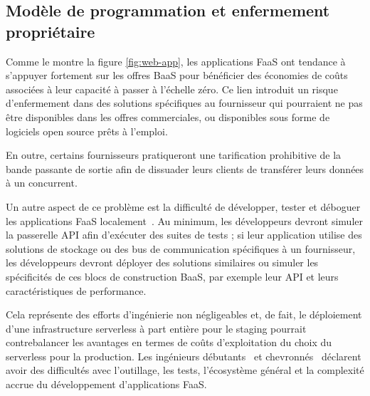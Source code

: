 \subsection{Modèle de programmation et enfermement propriétaire}

Comme le montre la figure \ref{fig:web-app}, les applications FaaS ont tendance à s'appuyer fortement sur les offres BaaS pour bénéficier des économies de coûts associées à leur capacité à passer à l'échelle zéro. Ce lien introduit un risque d'enfermement dans des solutions spécifiques au fournisseur qui pourraient ne pas être disponibles dans les offres commerciales, ou disponibles sous forme de logiciels open source prêts à l'emploi.

En outre, certains fournisseurs pratiqueront une tarification prohibitive de la bande passante de sortie afin de dissuader leurs clients de transférer leurs données à un concurrent.

Un autre aspect de ce problème est la difficulté de développer, tester et déboguer les applications FaaS localement~\cite{thalheimVMSHHypervisoragnosticGuest2022}. Au minimum, les développeurs devront simuler la passerelle API afin d'exécuter des suites de tests ; si leur application utilise des solutions de stockage ou des bus de communication spécifiques à un fournisseur, les développeurs devront déployer des solutions similaires ou simuler les spécificités de ces blocs de construction BaaS, par exemple leur API et leurs caractéristiques de performance.

Cela représente des efforts d'ingénierie non négligeables et, de fait, le déploiement d'une infrastructure serverless à part entière pour le staging pourrait contrebalancer les avantages en termes de coûts d'exploitation du choix du serverless pour la production. Les ingénieurs débutants~\cite{jeffreyd2022aws} et chevronnés~\cite{mitchell2022serverless} déclarent avoir des difficultés avec l'outillage, les tests, l'écosystème général et la complexité accrue du développement d'applications FaaS.

